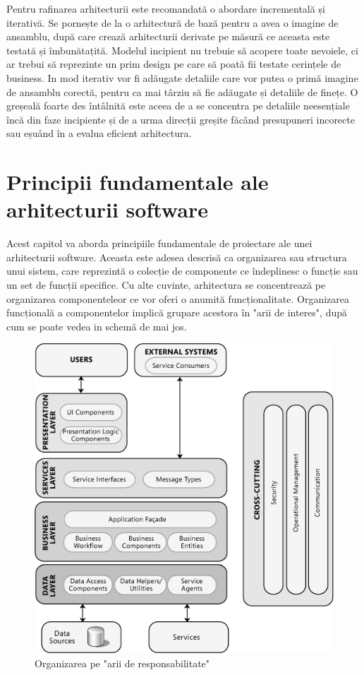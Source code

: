 \documentclass[12pt, a4paper, oneside, romanian]{teza-upb}
\begin{document}
Pentru rafinarea arhitecturii este recomandată o abordare incrementală și iterativă. Se pornește de la o arhitectură de bază pentru a avea o imagine de ansamblu, după care crează arhitecturii derivate pe măsură ce aceasta este testată și îmbunătațită. Modelul incipient nu trebuie să acopere toate nevoiele, ci ar trebui să reprezinte un prim design pe care să poată fii testate cerințele de business. In mod iterativ vor fi adăugate detaliile care vor putea o primă imagine de ansamblu corectă, pentru ca mai târziu să fie adăugate și detaliile de finețe. O greșeală foarte des întâlnită este aceea de a se concentra pe detaliile neesențiale încă din faze incipiente și de a urma direcții greșite făcând presupuneri incorecte sau eșuând în a evalua eficient arhitectura. 

\chapter{Principii fundamentale ale arhitecturii software}
Acest capitol va aborda principiile fundamentale de proiectare ale unei arhitecturii software. Aceasta este adesea descrisă ca organizarea sau structura unui sistem, care reprezintă o colecție de componente ce îndeplinesc o funcție sau un set de funcții specifice. Cu alte cuvinte, arhitectura se concentrează pe organizarea componenteleor ce vor oferi o anumită funcționalitate. Organizarea funcțională a componentelor implică grupare acestora în "arii de interes", după cum se poate vedea in schemă de mai jos.

\begin{figure}[ht]
\centering
\includegraphics*[scale=0.5]{img/IC351032.png}
\caption{Organizarea pe "arii de responsabilitate"}
\label{fig:arii_de_int}
\end{figure}
\end{document}
